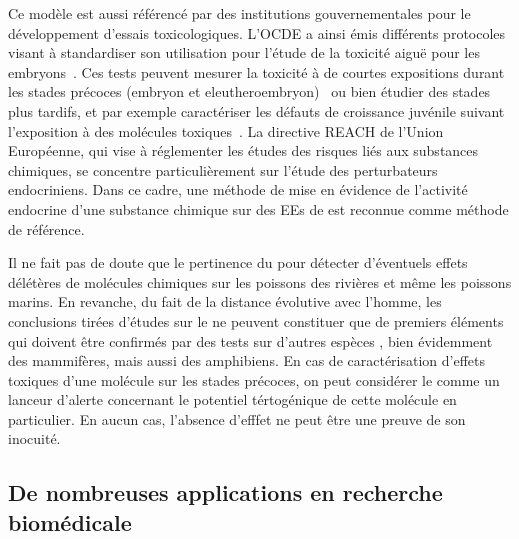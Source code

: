 \documentclass[\main/main.tex]{subfiles}
\begin{document}
%
Ce modèle est aussi référencé par des institutions gouvernementales pour le développement d'essais toxicologiques.
%
L'OCDE a ainsi émis différents protocoles visant à standardiser son utilisation pour l'étude de la toxicité aiguë pour les embryons~\cite{oecd_2013}. Ces tests peuvent mesurer la toxicité à de courtes expositions durant les stades précoces (embryon et eleutheroembryon)~\cite{oecd_2013a} ou bien étudier  des stades plus tardifs, et par exemple caractériser les défauts de croissance juvénile suivant l'exposition à des molécules toxiques~\cite{oecd_2000}.
%
La directive REACH de l'Union Européenne, qui vise à réglementer les études des risques liés aux substances chimiques, se concentre particulièrement sur l'étude des perturbateurs endocriniens.
%
Dans ce cadre, une méthode de mise en évidence de l'activité endocrine d'une substance chimique sur des EEs de \pz{} est reconnue comme méthode de référence\cite{europeanchemicalagencyechaandeuropeanfoodsafetyauthorityefsawiththetechnicalsupportofthejointresearchcentrejrc_2018}.

Il ne fait pas de doute que le  pertinence du \pz{} pour détecter d'éventuels effets délétères de molécules chimiques sur les poissons des rivières et même les poissons marins. En revanche, du fait de la distance évolutive avec l'homme, les conclusions tirées d'études sur le \pz{} ne peuvent constituer que de premiers éléments  qui doivent être confirmés par des tests sur d'autres espèces , bien évidemment des mammifères, mais aussi des amphibiens. En cas de caractérisation d'effets toxiques d'une molécule sur les stades précoces, on peut considérer le \pz{} comme un lanceur d'alerte concernant le potentiel tértogénique de cette molécule en particulier. En aucun cas, l'absence d'efffet ne peut être une preuve de son inocuité. 
    
    \subsection{De nombreuses applications en recherche biomédicale}
\end{document}
